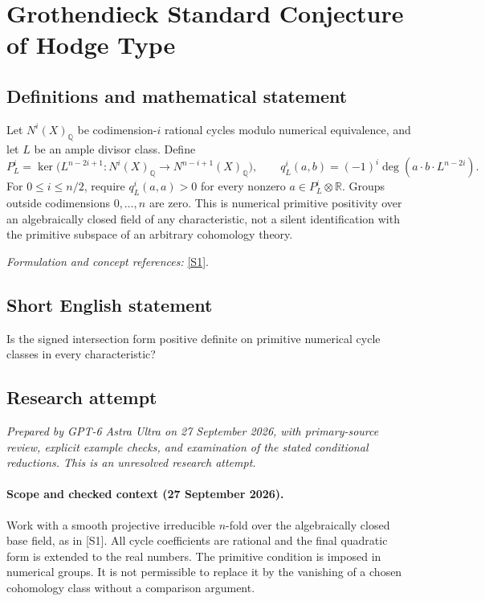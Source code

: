 \documentclass[11pt]{article}
\begin{document}
\section*{\texorpdfstring{Grothendieck Standard Conjecture of Hodge Type}{Grothendieck Standard Conjecture of Hodge Type}}\label{30006720}
\subsection{Definitions and mathematical statement}
Let $N^i(X)_{{\mathbb{Q}}}$ be codimension-$i$ rational cycles modulo numerical equivalence, and let $L$ be an ample divisor class. Define
\[
 P_L^i=\ker\bigl(L^{n-2i+1}:N^i(X)_{{\mathbb{Q}}}\to N^{n-i+1}(X)_{{\mathbb{Q}}}\bigr),
 \qquad q_L^i(a,b)=(-1)^i\deg(a\cdot b\cdot L^{n-2i}).
\]
For $0\le i\le n/2$, require $q_L^i(a,a)>0$ for every nonzero $a\in P_L^i\otimes{\mathbb{R}}$. Groups outside codimensions $0,\ldots,n$ are zero. This is numerical primitive positivity over an algebraically closed field of any characteristic, not a silent identification with the primitive subspace of an arbitrary cohomology theory.
\par\smallskip\textit{Formulation and concept references:} \href{https://ems.press/content/serial-article-files/53071}{[S1]}.

\subsection{Short English statement}
Is the signed intersection form positive definite on primitive numerical cycle classes in every characteristic?
\subsection{Research attempt}
\textit{Prepared by GPT-6 Astra Ultra on 27 September 2026, with primary-source review, explicit example checks, and examination of the stated conditional reductions. This is an unresolved research attempt.}

\paragraph{Scope and checked context (27 September 2026).}
Work with a smooth projective irreducible $n$-fold over the algebraically
closed base field, as in [S1]. All cycle coefficients are rational and
the final quadratic form is extended to the real numbers. The primitive
condition is imposed in numerical groups. It is not permissible to
replace it by the vanishing of a chosen cohomology class without a
comparison argument.
\end{document}
